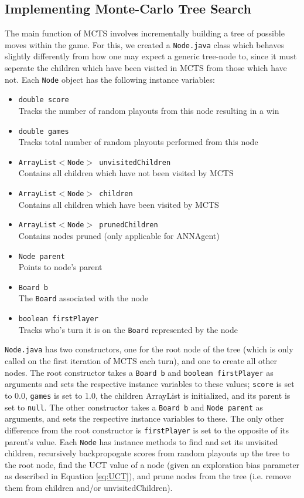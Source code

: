 \subsection{Implementing Monte-Carlo Tree Search}
The main function of MCTS involves incrementally building a tree of possible moves within the game.  For this, we created a \texttt{Node.java} class which behaves slightly differently from how one may expect a generic tree-node to, since it must seperate the children which have been visited in MCTS from those which have not.  Each \texttt{Node} object has the following instance variables:
\begin{itemize}
\item \texttt{double score}\\
Tracks the number of random playouts from this node resulting in a win
\item \texttt{double games}\\
Tracks total number of random playouts performed from this node
\item \texttt{ArrayList$<$Node$>$ unvisitedChildren}\\
Contains all children which have not been visited by MCTS
\item \texttt{ArrayList$<$Node$>$ children}\\
Contains all children which have been visited by MCTS
\item \texttt{ArrayList$<$Node$>$ prunedChildren}\\
Contains nodes pruned (only applicable for ANNAgent)
\item \texttt{Node parent}\\
Points to node's parent
\item \texttt{Board b}\\
The \texttt{Board} associated with the node
\item \texttt{boolean firstPlayer}\\
Tracks who's turn it is on the \texttt{Board} represented by the node
\end{itemize}

\texttt{Node.java} has two constructors, one for the root node of the tree (which is only called on the first iteration of MCTS each turn), and one to create all other nodes.  The root constructor takes a \texttt{Board b} and \texttt{boolean firstPlayer} as arguments and sets the respective instance variables to these values; \texttt{score} is set to 0.0, \texttt{games} is set to 1.0, the children ArrayList is initialized, and its parent is set to \texttt{null}.  The other constructor takes a \texttt{Board b} and \texttt{Node parent} as arguments, and sets the respective instance variables to these.  The only other difference from the root constructor is \texttt{firstPlayer} is set to the opposite of its parent's value.  Each \texttt{Node} has instance methods to find and set its unvisited children, recursively backpropogate scores from random playouts up the tree to the root node, find the UCT value of a node (given an exploration bias parameter as described in Equation \ref{eq:UCT}), and prune nodes from the tree (i.e. remove them from children and/or unvisitedChildren).


